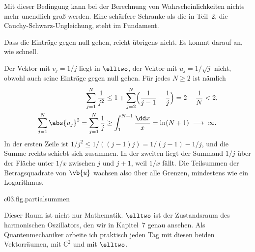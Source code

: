 \begin{vertiefung}
  Mit dieser Bedingung kann bei der Berechnung von Wahrscheinlichkeiten nichts mehr
  unendlich groß werden. Eine schärfere Schranke als die in Teil~2, die
  Cauchy-Schwarz-Ungleichung, steht im Fundament.

  Dass die Einträge gegen null gehen, reicht übrigens nicht. Es kommt darauf an, wie schnell.

  \begin{example}\label{c03.ex.rate}
    Der Vektor mit $v_j = 1/j$ liegt in $\elltwo$, der Vektor mit $u_j = 1/\sqrt{j}$ nicht,
    obwohl auch seine Einträge gegen null gehen. Für jedes $N \geq 2$ ist nämlich
    \begin{equation}\label{c03.eq.rate}
      \begin{aligned}
        \sum_{j=1}^{N} \frac{1}{j^2}
          &\leq 1 + \sum_{j=2}^{N} \Bigl( \frac{1}{j-1} - \frac{1}{j} \Bigr)
           = 2 - \frac{1}{N} < 2, \\
        \sum_{j=1}^{N} \abs{u_j}^2 = \sum_{j=1}^{N} \frac{1}{j}
          &\geq \int_{1}^{N+1} \frac{\dd x}{x} = \ln(N+1) \;\longrightarrow\; \infty .
      \end{aligned}
    \end{equation}
    In der ersten Zeile ist $1/j^2 \leq 1/((j-1)j) = 1/(j-1) - 1/j$, und die Summe rechts
    schiebt sich zusammen. In der zweiten liegt der Summand $1/j$ über der Fläche unter
    $1/x$ zwischen $j$ und $j+1$, weil $1/x$ fällt. Die Teilsummen der Betragsquadrate von
    $\vb{u}$ wachsen also über alle Grenzen, mindestens wie ein Logarithmus.
  \end{example}

  \begin{tpcfigure}{c03.fig.partialsummen}
    \caption{Die Zulassungsprüfung für $\elltwo$: die Teilsummen
      $\sum_{j=1}^{N} \abs{v_j}^2$ für $N = 1, \dots, 25$, auf vier Stellen gerundet; die
      Kurve für lauter Einsen ist nur bis $N = 5$ gezeichnet. Für
      $v_j = 1/j$ (Punkte, durchgezogen) bleiben sie unter der Schranke $2$ aus
      Gleichung~\eqref{c03.eq.rate} (dünne Linie): Der Vektor ist zugelassen. Für
      $v_j = 1/\sqrt{j}$ (Punkte, gestrichelt) wachsen sie über alle Grenzen, mindestens wie
      $\ln(N+1)$, für den
      Vektor mit lauter Einsen (Punkte, strichpunktiert) wie $N$: Beide sind nicht
      zugelassen, obwohl beim mittleren die Einträge gegen null gehen. In $\mathbb{C}^n$ hat
      die Summe nur $n$ Glieder, und es gibt nichts zu prüfen.}
  \end{tpcfigure}

  Dieser Raum ist nicht nur Mathematik. $\elltwo$ ist der Zustandsraum des harmonischen
  Oszillators, den wir in Kapitel~7 genau ansehen. Als Quantenmechaniker arbeite ich
  praktisch jeden Tag mit diesen beiden Vektorräumen, mit $\mathbb{C}^2$ und mit $\elltwo$.
\end{vertiefung}

